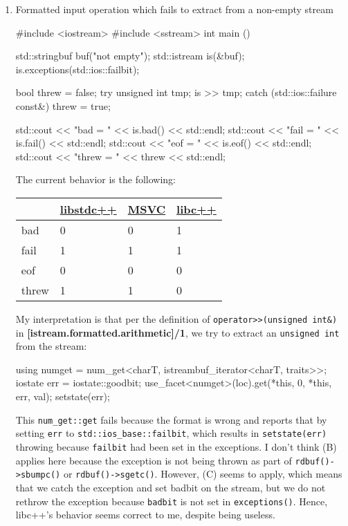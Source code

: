 \documentclass{wg21}
\newcommand{\cc}[1]{\texttt{#1}}
\begin{document}
\begin{enumerate}
  \item Formatted input operation which fails to extract from a non-empty stream
  \begin{cpp}
  #include <iostream>
  #include <sstream>
  int main () {
      std::stringbuf buf("not empty");
      std::istream is(&buf);
      is.exceptions(std::ios::failbit);

      bool threw = false;
      try {
          unsigned int tmp{};
          is >> tmp;
      } catch (std::ios::failure const&) {
          threw = true;
      }

      std::cout << "bad = " << is.bad() << std::endl;
      std::cout << "fail = " << is.fail() << std::endl;
      std::cout << "eof = " << is.eof() << std::endl;
      std::cout << "threw = " << threw << std::endl;
  }
  \end{cpp}

  The current behavior is the following:
  \begin{center}
  \begin{tabular}{| l | l | l | l |}
  \hline
         & \href{https://wandbox.org/permlink/fVgU3C1cZWXwbhAN}{libstdc++}
         & \href{http://rextester.com/CBDQE38523}{MSVC}
         & \href{https://wandbox.org/permlink/7sHlkXB3hBqZZ1Ge}{libc++} \\ \hline
  bad    & 0         & 0    & 1      \\ \hline
  fail   & 1         & 1    & 1      \\ \hline
  eof    & 0         & 0    & 0      \\ \hline
  threw  & 1         & 1    & 0      \\ \hline
  \end{tabular}
  \end{center}

  My interpretation is that per the definition of \cc{operator>>(unsigned int&)} in \textbf{[istream.formatted.arithmetic]/1}, we try to extract an \cc{unsigned int} from the stream:
  \begin{cpp}
    using numget = num_get<charT, istreambuf_iterator<charT, traits>>;
    iostate err = iostate::goodbit;
    use_facet<numget>(loc).get(*this, 0, *this, err, val);
    setstate(err);
  \end{cpp}
  This \cc{num_get::get} fails because the format is wrong and reports that by setting \cc{err} to \cc{std::ios_base::failbit}, which results in \cc{setstate(err)} throwing because \cc{failbit} had been set in the exceptions. I don't think (B) applies here because the exception is not being thrown as part of \cc{rdbuf()->sbumpc()} or \cc{rdbuf()->sgetc()}. However, (C) seems to apply, which means that we catch the exception and set badbit on the stream, but we do not rethrow the exception because \cc{badbit} is not set in \cc{exceptions()}. Hence, libc++'s behavior seems correct to me, despite being useless.


\end{enumerate}
\end{document}
